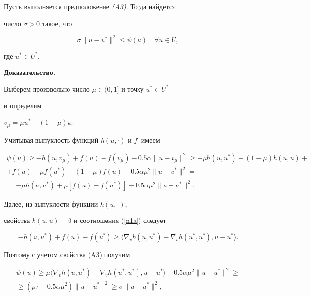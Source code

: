 \begin{thms}\label{terr}


Пусть выполняется предположение {\em (A3)}. Тогда найдется 


число $\sigma >0$ такое, что


$$


\sigma \|u-u^*\|^2 \le \psi(u) \quad \forall u \in U,


$$


где $u^* \in U^*$.


\end{thms}





{\bf Доказательство.} 


Выберем произвольно число $\mu \in (0,1]$ и точку $u^* \in U^*$


и определим\linebreak


$v_\mu=\mu u^* + (1-\mu)u$.


Учитывая выпуклость функций $h(u, \cdot)$ и $f$, имеем


\begin{multline*}


\psi(u) \ge -h(u, v_\mu) + f(u) - f(v_\mu) - 0.5\alpha\|u-v_\mu\|^2 


\ge -\mu h(u, u^*) -(1-\mu)h(u,u) + \\


+ f(u) - \mu f(u^*) - (1-\mu)f(u) - 0.5\alpha\mu^2\|u-u^*\|^2 = \\


= -\mu h(u, u^*) +\mu [f(u) - f(u^*)] - 0.5\alpha\mu^2\|u-u^*\|^2.


\end{multline*}


Далее, из выпуклости функции $h(u,\cdot)$, 


свойства $h(u,u)=0$ и соотношения (\ref{n1a}) следует


$$


-h(u, u^*) + f(u) -f(u^*) \ge


\langle \nabla_v h(u,u^*) - \nabla_v h(u^*,u^*), u-u^*\rangle.  


$$


Поэтому с учетом свойства (A3) получим


\begin{multline*}


\psi(u) \ge \mu\langle \nabla_v h(u,u^*) - \nabla_v h(u^*,u^*), u-u^*\rangle  


-0.5\alpha\mu^2\|u-u^*\|^2 \ge \\


\ge (\mu\tau - 0.5 \alpha\mu^2)\|u-u^*\|^2 \ge \sigma\|u-u^*\|^2,


\end{multline*}



